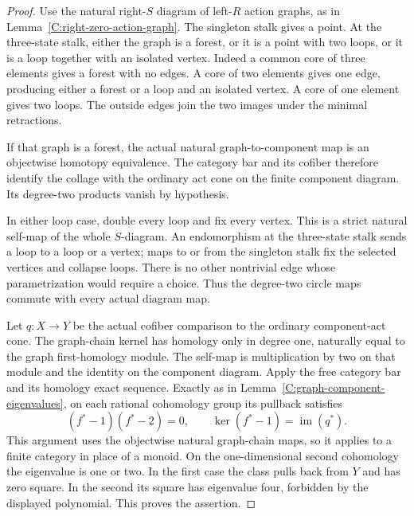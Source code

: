 \begin{proof}
Use the natural right-$S$ diagram of left-$R$ action graphs,
as in Lemma~\ref{C:right-zero-action-graph}. The singleton
stalk gives a point. At the three-state stalk, either the graph
is a forest, or it is a point with two loops, or it is a loop
together with an isolated vertex. Indeed a common core of
three elements gives a forest with no edges. A core of two
elements gives one edge, producing either a forest or a loop
and an isolated vertex. A core of one element gives two loops.
The outside edges join the two images under the minimal
retractions.

If that graph is a forest, the actual natural graph-to-component
map is an objectwise homotopy equivalence. The category bar
and its cofiber therefore identify the collage with the
ordinary act cone on the finite component diagram. Its
degree-two products vanish by hypothesis.

In either loop case, double every loop and fix every vertex.
This is a strict natural self-map of the whole $S$-diagram.
An endomorphism at the three-state stalk sends a loop to a
loop or a vertex; maps to or from the singleton stalk fix the
selected vertices and collapse loops. There is no other
nontrivial edge whose parametrization would require a choice.
Thus the degree-two circle maps commute with every actual
diagram map.

Let $q:X\to Y$ be the actual cofiber comparison to the ordinary
component-act cone. The graph-chain kernel has homology only
in degree one, naturally equal to the graph first-homology
module. The self-map is multiplication by two on that module
and the identity on the component diagram. Apply the free
category bar and its homology exact sequence. Exactly as in
Lemma~\ref{C:graph-component-eigenvalues}, on each rational
cohomology group its pullback satisfies
\[
 (f^*-1)(f^*-2)=0,\qquad
 \ker(f^*-1)=\operatorname{im}(q^*).
\]
This argument uses the objectwise natural graph-chain maps,
so it applies to a finite category in place of a monoid.
On the one-dimensional second cohomology the eigenvalue is
one or two. In the first case the class pulls back from $Y$
and has zero square. In the second its square has eigenvalue
four, forbidden by the displayed polynomial. This proves
the assertion.
\end{proof}

